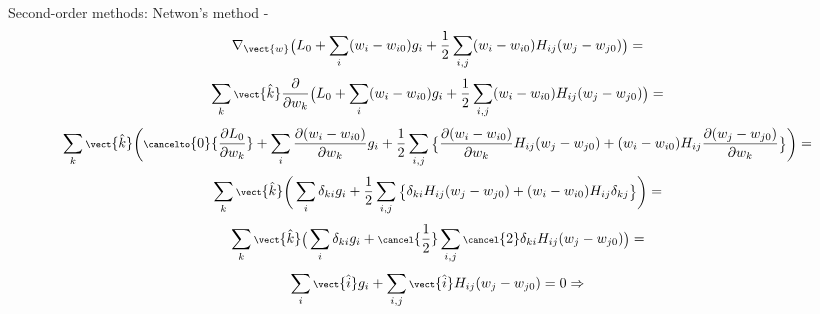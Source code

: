 \begin{frame}[t,allowframebreaks]{
    Second-order methods: Netwon's method -}
    \begin{equation*}
        \scriptsize
        \nabla_{\vect{w}} \Big( 
            L_0 + 
            \sum_{i} (w_{i} - w_{i0}) g_{i} +
            \frac{1}{2} \sum_{i,j} (w_{i} - w_{i0}) H_{ij} (w_j - w_{j0})
        \Big) = 
    \end{equation*}
    \begin{equation*}
        \scriptsize
        \sum_{k} \vect{\hat{k}} \frac{\partial}{\partial w_k}
        \Big( 
            L_0 + 
            \sum_{i} (w_{i} - w_{i0}) g_{i} +
            \frac{1}{2} \sum_{i,j} (w_{i} - w_{i0}) H_{ij} (w_j - w_{j0})
        \Big) = 
    \end{equation*}
    \begin{equation*}
        \scriptsize
        \sum_{k} \vect{\hat{k}} 
        \Bigg( 
            \cancelto{0}{\frac{\partial L_0}{\partial w_k}}
            + 
            \sum_{i} 
            \frac{\partial (w_{i} - w_{i0})}{\partial w_k}
             g_{i} +
            \frac{1}{2} 
            \sum_{i,j} 
            \Big\{
                \frac{\partial (w_{i} - w_{i0})}{\partial w_k} H_{ij} (w_j - w_{j0}) +
                (w_{i} - w_{i0}) H_{ij} \frac{\partial (w_j - w_{j0})}{\partial w_k}
            \Big\}            
        \Bigg) = 
    \end{equation*}
    \begin{equation*}
        \scriptsize
        \sum_{k} \vect{\hat{k}} 
        \Bigg( 
            \sum_{i} 
            \delta_{ki}
             g_{i} +
            \frac{1}{2} 
            \sum_{i,j} 
            \Big\{
                \delta_{ki} H_{ij} (w_j - w_{j0}) +
                (w_{i} - w_{i0}) H_{ij} \delta_{kj}
            \Big\}            
        \Bigg) = 
    \end{equation*}
    \begin{equation*}
        \scriptsize
        \sum_{k} \vect{\hat{k}} 
        \Big( 
            \sum_{i} 
                \delta_{ki}
                g_{i} +
            \cancel{\frac{1}{2}}
                \sum_{i,j}
                \cancel{2} \delta_{ki} H_{ij} (w_j - w_{j0}) 
        \Big) = 
    \end{equation*}
    \begin{equation*}
        \scriptsize
        \sum_{i} 
            \vect{\hat{i}}
            g_{i} +
        \sum_{i,j}
            \vect{\hat{i}}
            H_{ij} (w_j - w_{j0}) 
            = 0 \Rightarrow
    \end{equation*}


\end{frame}
